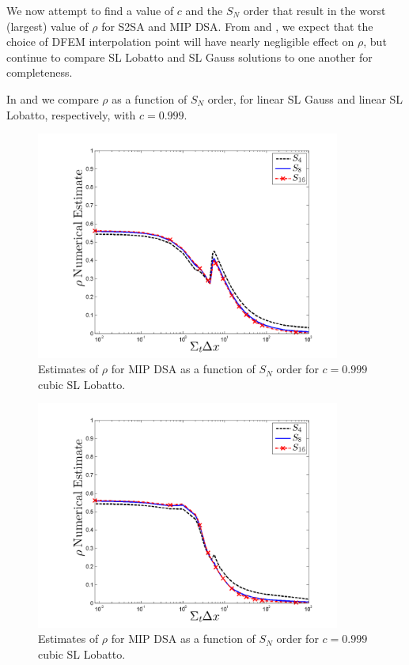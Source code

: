 We now attempt to find a value of $c$ and the $S_N$ order that result in the worst (largest) value of $\rho$ for S2SA and MIP DSA. 
From  and , we expect that the choice of DFEM interpolation point will have nearly negligible effect on $\rho$, but continue to compare SL Lobatto and SL Gauss solutions to one another for completeness.

In  and  we compare $\rho$ as a function of $S_N$ order, for linear SL Gauss and linear SL  Lobatto, respectively, with $c=0.999$.
\begin{figure}[!htp]
\centering
\includegraphics[width=10cm]{chapter4_acceleration/Constant_XS_sn_comparions_MIP_Gauss.png}
\caption{Estimates of $\rho$ for MIP DSA as a function of  $S_N$ order for $c=0.999$ cubic SL Lobatto.}
\label{fig:mip_gauss_as_fun_sn}
\end{figure}
%
%
\begin{figure}[!hbp]
\centering
\includegraphics[width=10cm]{chapter4_acceleration/Constant_XS_sn_comparions_MIP_Lobatto.png}
\caption{Estimates of $\rho$ for MIP DSA as a function of  $S_N$ order for $c=0.999$ cubic SL Lobatto.}
\label{fig:mip_lobatto_as_fun_sn}
\end{figure}
